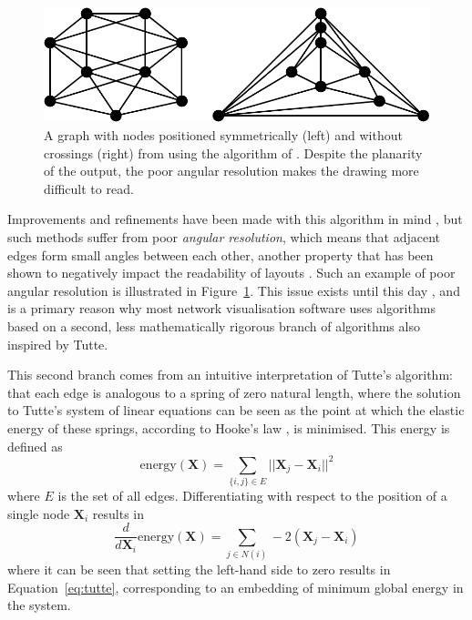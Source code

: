\begin{figure}
    \centering
    \includegraphics[width=\textwidth]{stress/dFPP.pdf}
    \caption[An example output of a planarity-based algorithm]{A graph with nodes positioned symmetrically (left) and without crossings (right) from using the algorithm of \citet{DeFraysseix1990}. Despite the planarity of the output, the poor angular resolution makes the drawing more difficult to read.}
    \label{fig:dFPP}
\end{figure}

Improvements and refinements have been made with this algorithm in mind \citep{Zhang2005}, but such methods suffer from poor \emph{angular resolution}, which means that adjacent edges form small angles between each other, another property that has been shown to negatively impact the readability of layouts \citep{Purchase1997}.
Such an example of poor angular resolution is illustrated in Figure~\ref{fig:dFPP}.
This issue exists until this day \citep{Eades2012}, and is a primary reason why most network visualisation software uses algorithms based on a second, less mathematically rigorous branch of algorithms also inspired by Tutte.

This second branch comes from an intuitive interpretation of Tutte's algorithm: that each edge is analogous to a spring of zero natural length, where the solution to Tutte's system of linear equations can be seen as the point at which the elastic energy of these springs, according to Hooke's law \citep{Hooke1678}, is minimised. This energy is defined as
\begin{equation}
  \mathrm{energy}(\mathbf{X}) = \sum_{\{i,j\}\in E}||\mathbf{X}_j-\mathbf{X}_i||^2
\label{eq:tutte_energy}
\end{equation}
where $E$ is the set of all edges. Differentiating with respect to the position of a single node $\mathbf{X}_i$ results in
\begin{equation}
  \frac{d}{d\mathbf{X}_i}\mathrm{energy}(\mathbf{X}) = \sum_{j\in N(i)}-2(\mathbf{X}_j-\mathbf{X}_i)
\label{eq:tutte_force}
\end{equation}
where it can be seen that setting the left-hand side to zero results in Equation~\eqref{eq:tutte}, corresponding to an embedding of minimum global energy in the system.

